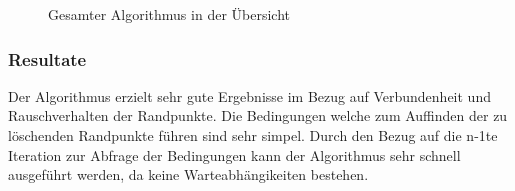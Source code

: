 \begin{figure}[!ht]
  \centering
   \caption{Gesamter Algorithmus in der Übersicht}
\end{figure}
\FloatBarrier






\subsubsection{Resultate}

Der Algorithmus erzielt sehr gute Ergebnisse im Bezug auf Verbundenheit und Rauschverhalten der Randpunkte. Die Bedingungen welche zum Auffinden der zu löschenden Randpunkte führen sind sehr simpel. Durch den Bezug auf die n-1te Iteration zur Abfrage der Bedingungen kann der Algorithmus sehr schnell ausgeführt werden, da keine Warteabhängikeiten bestehen.

\newpage
